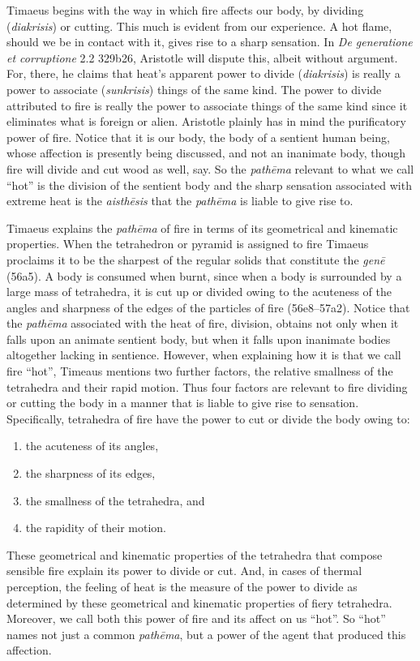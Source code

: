 Timaeus begins with the way in which fire affects our body, by dividing (\emph{diakrisis}) or cutting. This much is evident from our experience. A hot flame, should we be in contact with it, gives rise to a sharp sensation. In \emph{De generatione et corruptione} 2.2 329b26, Aristotle will dispute this, albeit without argument. For, there, he claims that heat's apparent power to divide (\emph{diakrisis}) is really a power to associate (\emph{sunkrisis}) things of the same kind. The power to divide attributed to fire is really the power to associate things of the same kind since it eliminates what is foreign or alien. Aristotle plainly has in mind the purificatory power of fire. Notice that it is our body, the body of a sentient human being, whose affection is presently being discussed, and not an inanimate body, though fire will divide and cut wood as well, say. So the \emph{pathēma} relevant to what we call ``hot'' is the division of the sentient body and the sharp sensation associated with extreme heat is the \emph{aisthēsis} that the \emph{pathēma} is liable to give rise to. 

Timaeus explains the \emph{pathēma} of fire in terms of its geometrical and kinematic properties. When the tetrahedron or pyramid is assigned to fire Timaeus proclaims it to be the sharpest of the regular solids that constitute the \emph{genē} (56a5). A body is consumed when burnt, since when a body is surrounded by a large mass of tetrahedra, it is cut up or divided owing to the acuteness of the angles and sharpness of the edges of the particles of fire (56e8--57a2). Notice that the \emph{pathēma} associated with the heat of fire, division, obtains not only when it falls upon an animate sentient body, but when it falls upon inanimate bodies altogether lacking in sentience. However, when explaining how it is that we call fire ``hot'', Timeaus mentions two further factors, the relative smallness of the tetrahedra and their rapid motion. Thus four factors are relevant to fire dividing or cutting the body in a manner that is liable to give rise to sensation. Specifically, tetrahedra of fire have the power to cut or divide the body owing to:
\begin{enumerate}
	\item the acuteness of its angles,
	\item the sharpness of its edges,
	\item the smallness of the tetrahedra, and
	\item the rapidity of their motion.
\end{enumerate}
These geometrical and kinematic properties of the tetrahedra that compose sensible fire explain its power to divide or cut. And, in cases of thermal perception, the feeling of heat is the measure of the power to divide as determined by these geometrical and kinematic properties of fiery tetrahedra. Moreover, we call both this power of fire and its affect on us ``hot''. So ``hot'' names not just a common \emph{pathēma}, but a power of the agent that produced this affection. 

